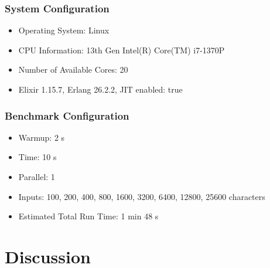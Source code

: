 \documentclass[a4paper,11pt]{article}
\begin{document}
\subsubsection*{System Configuration}
\begin{itemize}[itemsep=0pt, topsep=0pt]
    \item Operating System: Linux
    \item CPU Information: 13th Gen Intel(R) Core(TM) i7-1370P
    \item Number of Available Cores: 20
    \item Elixir 1.15.7, Erlang 26.2.2, JIT enabled: true
\end{itemize}
\subsubsection*{Benchmark Configuration}
\begin{itemize}[itemsep=0pt, topsep=0pt]
    \item Warmup: 2 s
    \item Time: 10 s
    \item Parallel: 1
    \item Inputs: 100, 200, 400, 800, 1600, 3200, 6400, 12800, 25600 characters
    \item Estimated Total Run Time: 1 min 48 s
\end{itemize}



\section*{Discussion}\label{sec:discussion}
\end{document}
